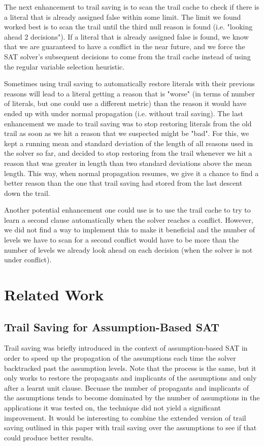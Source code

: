 \documentclass[runningheads]{llncs}
\begin{document}
The next enhancement to trail saving is to scan the trail cache to
check if there is a literal that is already assigned false within some
limit. The limit we found worked best is to scan the trail until the
third null reason is found (i.e. "looking ahead 2 decisions"). If a
literal that is already assigned false is found, we know that we are
guaranteed to have a conflict in the near future, and we force the SAT
solver's subsequent decisions to come from the trail cache instead of
using the regular variable selection heuristic.

Sometimes using trail saving to automatically restore literals with
their previous reasons will lead to a literal getting a reason that is
"worse" (in terms of number of literals, but one could use a different
metric) than the reason it would have ended up with under normal
propagation (i.e. without trail saving). The last enhancement we made
to trail saving was to stop restoring literals from the old trail as
soon as we hit a reason that we suspected might be "bad". For this, we
kept a running mean and standard deviation of the length of all
reasons used in the solver so far, and decided to stop restoring from
the trail whenever we hit a reason that was greater in length than two
standard deviations above the mean length. This way, when normal
propagation resumes, we give it a chance to find a better reason than
the one that trail saving had stored from the last descent down the
trail.

Another potential enhancement one could use is to use the trail cache
to try to learn a second clause automatically when the solver reaches
a conflict. However, we did not find a way to implement this to make
it beneficial and the number of levels we have to scan for a second
conflict would have to be more than the number of levels we already
look ahead on each decision (when the solver is not under conflict).

\section{Related Work}
\subsection{Trail Saving for Assumption-Based SAT}
Trail saving was briefly introduced in the context of assumption-based
SAT \cite{DBLP:conf/sat/HickeyB19} in order to speed up the
propagation of the assumptions each time the solver backtracked past
the assumption levels. Note that the process is the same, but it only
works to restore the propagants and implicants of the assumptions and
only after a learnt unit clause. Becuase the number of propagants and
implicants of the assumptions tends to become dominated by the number
of assumptions in the applications it was tested on, the technique did
not yield a significant improvement. It would be interesting to
combine the extended version of trail saving outlined in this paper
with trail saving over the assumptions to see if that could produce
better results.
\end{document}
